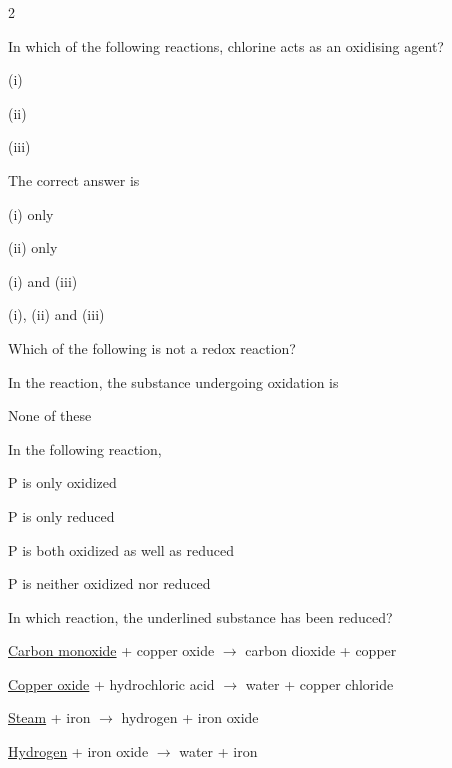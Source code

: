 \documentclass[10pt,a4paper]{article}
\begin{document}
\begin{multicols}{2}
\begin{questions}
\item In which of the following reactions, chlorine acts as an oxidising agent?
\begin{options}[topsep=2pt]
  \item[] (i) 
  \item[] (ii) 
  \item[] (iii) 
\end{options}
The correct answer is
\begin{options}
  \item (i) only
  \item (ii) only
  \item (i) and (iii)
  \item (i), (ii) and (iii)
\end{options}

\item Which of the following is not a redox reaction?
\begin{options}
  \item {}
  \item {}
  \item {}
  \item {}
\end{options}

\item In the reaction,  the substance undergoing oxidation is
\begin{options}
  \item {}
  \item {}
  \item {}
  \item None of these
\end{options}

\item In the following reaction, 
\begin{options}
  \item P is only oxidized
  \item P is only reduced
  \item P is both oxidized as well as reduced
  \item P is neither oxidized nor reduced
\end{options}

\item In which reaction, the underlined substance has been reduced?
\begin{options}
  \item \underline{Carbon monoxide} + copper oxide $\to$ carbon dioxide + copper
  \item \underline{Copper oxide} + hydrochloric acid $\to$ water + copper chloride
  \item \underline{Steam} + iron $\to$ hydrogen + iron oxide
  \item \underline{Hydrogen} + iron oxide $\to$ water + iron
\end{options}


\end{questions}
\end{multicols}
\end{document}
